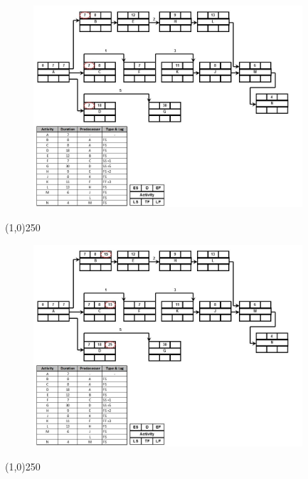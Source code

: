 \begin{frame}
\begin{figure}
	\centering
		\includegraphics[width = 10.0cm]{oldnotes/Slide202.jpg}
\end{figure}
\end{frame}
\begin{center}\line(1,0){250}\end{center}




\begin{frame}
\begin{figure}
	\centering
		\includegraphics[width = 10.0cm]{oldnotes/Slide203.jpg}
\end{figure}
\end{frame}
\begin{center}\line(1,0){250}\end{center}




